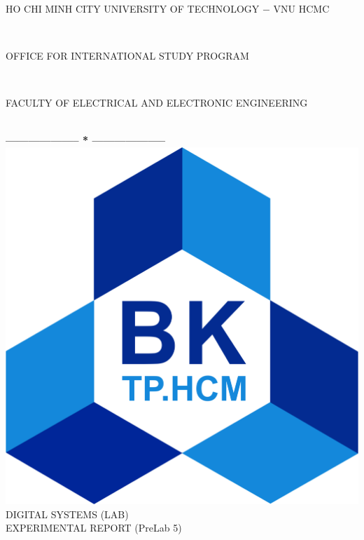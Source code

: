 \documentclass[13pt,a4paper]{report}
\begin{document}
\fontsize{13pt}{18pt}\selectfont
\begin{titlepage}
\thispagestyle{empty}
\thisfancypage{%
\setlength{\fboxsep}{0pt}%
\fbox}{} %
\

\begin{center}
\begin{large}
HO CHI MINH CITY UNIVERSITY OF TECHNOLOGY $-$ VNU HCMC
\end{large} \\
\begin{large}
OFFICE FOR INTERNATIONAL STUDY PROGRAM
\end{large} \\
\begin{large}
FACULTY OF ELECTRICAL AND ELECTRONIC ENGINEERING
\end{large} \\
\textbf{--------------------  *  --------------------}\\[4cm]
\includegraphics[scale=0.1]{logobk.png}\\[1cm]
{\fontsize{20pt}{1}\selectfont DIGITAL SYSTEMS (LAB)}\\
{\fontsize{20pt}{1}\selectfont EXPERIMENTAL REPORT (PreLab 5)}\\[2.5cm]
\end{center}


\end{titlepage}
\end{document}
